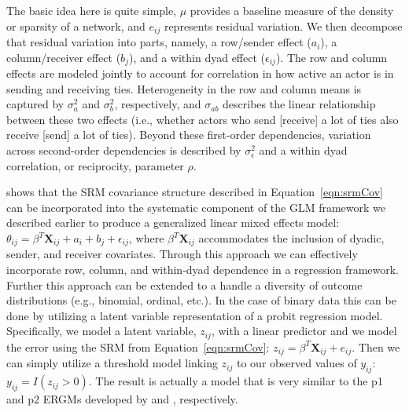 The basic idea here is quite simple, $\mu$ provides a baseline measure of the density or sparsity of a network, and $e_{ij}$ represents residual variation. We then decompose that residual variation into parts, namely, a row/sender effect ($a_{i}$), a column/receiver effect ($b_{j}$), and a within dyad effect ($\epsilon_{ij}$). The row and column effects are modeled jointly to account for correlation in how active an actor is in sending and receiving ties. Heterogeneity in the row and column means is captured by $\sigma_{a}^{2}$ and $\sigma_{b}^{2}$, respectively, and $\sigma_{ab}$ describes the linear relationship between these two effects (i.e., whether actors who send [receive] a lot of ties also receive [send] a lot of ties). Beyond these first-order dependencies, variation across second-order dependencies is described by $\sigma_{\epsilon}^{2}$ and a within dyad correlation, or reciprocity, parameter $\rho$. 

\citet{hoff:2005} shows that the SRM covariance structure described in Equation~\ref{eqn:srmCov} can be incorporated into the systematic component of the GLM framework we described earlier to produce a generalized linear mixed effects model: $\theta_{ij} = \beta^{T} \mathbf{X}_{ij} + a_{i} + b_{j} + \epsilon_{ij}$, where $ \beta^{T} \mathbf{X}_{ij}$ accommodates the inclusion of dyadic, sender, and receiver covariates. Through this approach we can effectively incorporate row, column, and within-dyad dependence in a regression framework. Further this approach can be extended to a handle a diversity of outcome distributions (e.g., binomial, ordinal, etc.). In the case of binary data this can be done by utilizing a latent variable representation of a probit regression model. Specifically, we model a latent variable, $z_{ij}$, with a linear predictor and we model the error using the SRM from Equation~\ref{eqn:srmCov}: $z_{ij} = \beta^{T} \mathbf{X}_{ij} + e_{ij}$. Then we can simply utilize a threshold model linking $z_{ij}$ to our observed values of $y_{ij}$: $y_{ij} = I(z_{ij}>0)$. The result is actually a model that is very similar to the p1 and p2 ERGMs developed by \citet{holland:leinhardt1981} and \citet{duijn:etal:2004}, respectively. 


